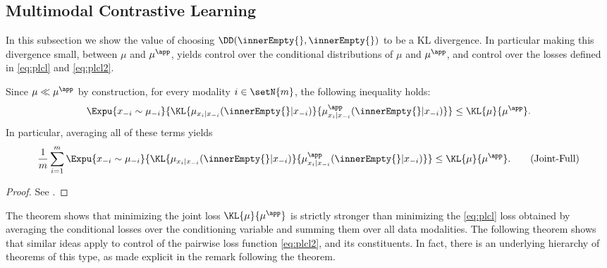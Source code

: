 \documentclass{article}
\begin{document}
\subsection{Multimodal Contrastive Learning}
\label{subsec:SettingMultimodalContrastiveLearning}

In this subsection we show the value of choosing $\DD(\innerEmpty{},
 \innerEmpty{})$ to be a KL divergence. In particular making this divergence
small, between $\mu$ and $\mu^\app$, yields control over the conditional
distributions of $\mu$ and $\mu^\app$, and control over the losses defined
in \eqref{eq:plcl} and \eqref{eq:plcl2}.

\begin{theorem}
 \label{thm:JointVsFullConditionals}
 Since $\mu\ll \mu^\app$ by construction, for every modality $i \in
  \setN{m}$, the following inequality holds:
 \begin{align*}
  \Expu{x_{-i}\sim \mu_{-i}}{\KL{\mu_{x_i\vert x_{-i}}(\innerEmpty{}\vert x_{-i})}{
    \mu^\app_{x_i\vert x_{-i}}(\innerEmpty{}\vert x_{-i})
   }}
  \leq \KL{\mu}{\mu^\app}.
 \end{align*}
 In particular, averaging all of these terms yields
 \begin{align}
  \frac{1}{m} \sum_{i=1}^{m}
  \Expu{x_{-i}\sim \mu_{-i}}{\KL{\mu_{x_i\vert x_{-i}}(\innerEmpty{}\vert x_{-i})}{
    \mu^\app_{x_i\vert x_{-i}}(\innerEmpty{}\vert x_{-i})
   }}
  \leq \KL{\mu}{\mu^\app}.
  \tag{Joint-Full}
  \label{eq:JointKLBoundsFullConditionals}
 \end{align}
\end{theorem}
\begin{proof}
 See .
\end{proof}
The theorem shows that minimizing the joint loss $\KL{\mu}{\mu^\app}$ is
strictly stronger than
minimizing the \eqref{eq:plcl} loss obtained by averaging the conditional
losses over the conditioning variable and summing them over all data modalities.
The following theorem shows that similar ideas apply to control of the
pairwise loss function \eqref{eq:plcl2}, and its constituents.
In fact, there is an underlying hierarchy of theorems of this type,
as made explicit in the remark following the theorem.
\end{document}
